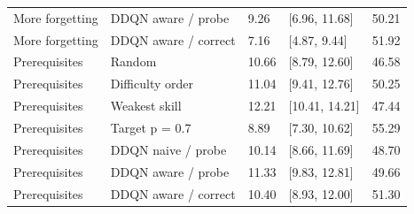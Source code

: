 \documentclass[preprint,11pt,authoryear]{elsarticle}
\begin{document}
\begin{longtable}{p{}p{}p{}p{}p{}}
More forgetting & DDQN aware / probe & 9.26 & [6.96, 11.68] & 50.21\\

More forgetting & DDQN aware / correct & 7.16 & [4.87, 9.44] & 51.92\\

Prerequisites & Random & 10.66 & [8.79, 12.60] & 46.58\\

Prerequisites & Difficulty order & 11.04 & [9.41, 12.76] & 50.25\\

Prerequisites & Weakest skill & 12.21 & [10.41, 14.21] & 47.44\\

Prerequisites & Target p = 0.7 & 8.89 & [7.30, 10.62] & 55.29\\

Prerequisites & DDQN naive / probe & 10.14 & [8.66, 11.69] & 48.70\\

Prerequisites & DDQN aware / probe & 11.33 & [9.83, 12.81] & 49.66\\

Prerequisites & DDQN aware / correct & 10.40 & [8.93, 12.00] & 51.30\\

\end{longtable}\endgroup
\end{document}
